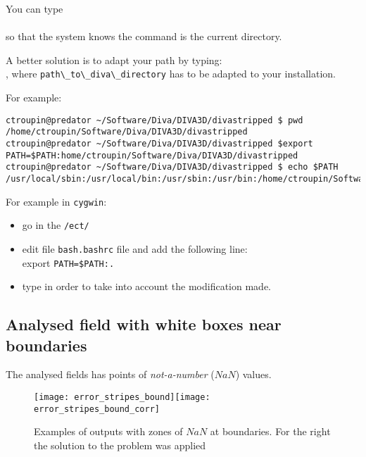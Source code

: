 You can type \\
\\
so that the system knows the command is the current directory.

A better solution is to adapt your path by typing:\\
, where \verb|path\_to\_diva\_directory| has to be adapted to your installation.

For example:
\begin{lstlisting}[style=Bash]
ctroupin@predator ~/Software/Diva/DIVA3D/divastripped $ pwd
/home/ctroupin/Software/Diva/DIVA3D/divastripped
ctroupin@predator ~/Software/Diva/DIVA3D/divastripped $export  PATH=$PATH:home/ctroupin/Software/Diva/DIVA3D/divastripped
ctroupin@predator ~/Software/Diva/DIVA3D/divastripped $ echo $PATH
/usr/local/sbin:/usr/local/bin:/usr/sbin:/usr/bin:/home/ctroupin/Software/Diva/DIVA3D/divastripped/
\end{lstlisting}

For example in \texttt{cygwin}:\\
\begin{itemize}
\item go in the \texttt{/ect/}
\item edit file \texttt{bash.bashrc} file
and add the following line:\\
export \texttt{PATH=\$PATH:.}
\item type  in order to take into account the modification made.
\end{itemize}



\subsection{Analysed field with white boxes near boundaries}

The analysed fields has points of \textit{not-a-number} ($NaN$) values.

\begin{figure}[htpb]
\centering
\texttt{[image: error\_stripes\_bound]}\texttt{[image: error\_stripes\_bound\_corr]}
\caption[Examples of \diva outputs with zones of $NaN$ at boundaries.]{Examples of \diva outputs with zones of $NaN$ at boundaries. For the right the solution to the problem was applied \label{fig:error_stripes}}
\end{figure}

